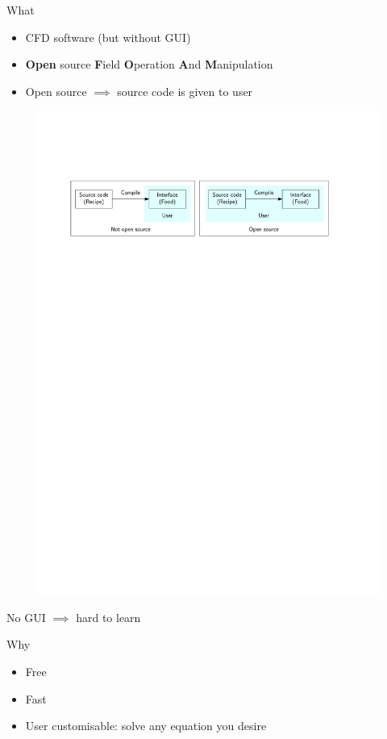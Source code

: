 \begin{frame}
    \begin{block}{What}
        \begin{itemize}
            \item CFD software (but without GUI)
            \item \textbf{Open} source \textbf{F}ield \textbf{O}peration \textbf{A}nd \textbf{M}anipulation
            \item Open source $\implies$ source code is given to user
        \end{itemize}
    \end{block}
    \begin{figure}
        \includegraphics[width=\linewidth]{opensource_illustration}
    \end{figure}
    No GUI $\implies$ hard to learn
    \begin{block}{Why}
        \begin{itemize}
            \item Free
            \item Fast
            \item User customisable: solve any equation you desire
        \end{itemize}
    \end{block}
\end{frame}

